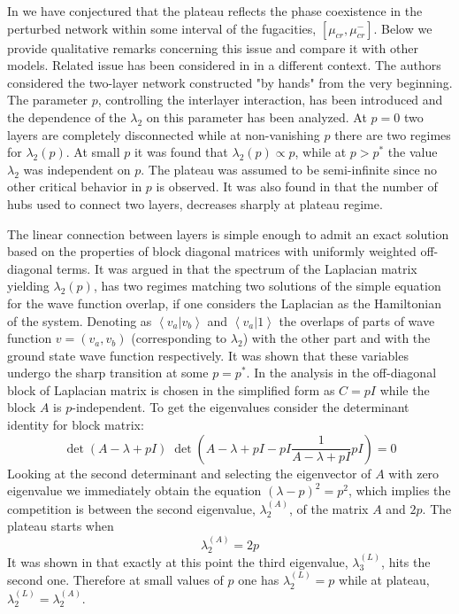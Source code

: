 \documentclass[aps,12pt]{revtex4}
\newcommand{\be}{\begin{equation}}
\newcommand{\ee}{\end{equation}}
\newcommand{\la}{\left<}
\newcommand{\ra}{\right>}
\begin{document}
In \cite{color} we have conjectured that the plateau reflects the phase coexistence in the perturbed network within some interval of the fugacities, $[\mu_{cr}, \mu^{-}_{cr}]$. Below we provide qualitative remarks concerning this issue and compare it with other models. Related issue has been considered in \cite{arenas2, arenas, radicchi} in a different context. The authors considered the two-layer network constructed "by hands" from the very beginning. The parameter $p$, controlling the interlayer interaction, has been introduced and the dependence of the $\lambda_2$ on this parameter has been analyzed. At $p=0$ two layers are completely disconnected while at non-vanishing $p$ there are two regimes for $\lambda_2(p)$. At small $p$ it was found that $\lambda_2(p)\propto p$, while at $p>p^*$ the value $\lambda_2$ was independent on $p$. The plateau was assumed to be semi-infinite since no other critical behavior in $p$ is observed. It was also found in \cite{hub} that the number of hubs used to connect two layers, decreases sharply at plateau regime.

The linear connection between layers is simple enough to admit an exact solution based on the properties of block diagonal matrices with uniformly weighted off-diagonal terms. It was argued in \cite{arenas2} that the spectrum of the Laplacian matrix yielding $\lambda_2(p)$, has two regimes matching two solutions of the simple equation for the wave function overlap, if one considers the Laplacian as the Hamiltonian of the system. Denoting as $\la v_a|v_b\ra$ and $\la v_a|1 \ra$ the overlaps of parts of wave function $v=(v_a, v_b)$ (corresponding to  $\lambda_2$) with the other part and with the ground state wave function respectively. It was shown that these variables undergo the sharp transition at some $p=p^*$.  In  the analysis in \cite{arenas2,vanmighem,radicchi} the off-diagonal block of Laplacian matrix is chosen in the simplified form as  $C=p I$ while the block $A$ is $p$-independent.  To get the eigenvalues consider the determinant identity for block matrix:
\be
\det(A-\lambda +pI)\; \det \left(A-\lambda +pI - pI\frac{1}{A-\lambda +pI}pI\right)=0
\ee
Looking at the second determinant and selecting the eigenvector of $A$ with zero eigenvalue we immediately obtain the equation $(\lambda-p)^2=p^2$, which implies the competition is between the second eigenvalue, $\lambda_2^{(A)}$, of the matrix $A$ and $2p$. The plateau starts when
\be
\lambda_2^{(A)}= 2p
\ee
It was shown in \cite{arenas2} that exactly at this point the third eigenvalue, $\lambda_3^{(L)}$, hits the second one. Therefore at small values of $p$ one has $\lambda_2^{(L)}=p$ while at plateau, $\lambda_2^{(L)}=\lambda_2^{(A)}$.
\end{document}
